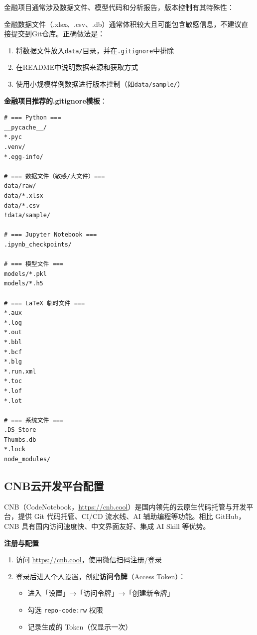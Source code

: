 金融项目通常涉及数据文件、模型代码和分析报告，版本控制有其特殊性：

\begin{warningbox}[数据文件不要纳入Git管理]
金融数据文件（.xlsx、.csv、.db）通常体积较大且可能包含敏感信息，不建议直接提交到Git仓库。正确做法是：
\begin{enumerate}[leftmargin=2em]
  \item 将数据文件放入\texttt{data/}目录，并在\texttt{.gitignore}中排除
  \item 在README中说明数据来源和获取方式
  \item 使用小规模样例数据进行版本控制（如\texttt{data/sample/}）
\end{enumerate}
\end{warningbox}

\textbf{金融项目推荐的.gitignore模板}：

\begin{lstlisting}
# === Python ===
__pycache__/
*.pyc
.venv/
*.egg-info/

# === 数据文件（敏感/大文件）===
data/raw/
data/*.xlsx
data/*.csv
!data/sample/

# === Jupyter Notebook ===
.ipynb_checkpoints/

# === 模型文件 ===
models/*.pkl
models/*.h5

# === LaTeX 临时文件 ===
*.aux
*.log
*.out
*.bbl
*.bcf
*.blg
*.run.xml
*.toc
*.lof
*.lot

# === 系统文件 ===
.DS_Store
Thumbs.db
*.lock
node_modules/
\end{lstlisting}

\subsection{CNB云开发平台配置}

CNB（CodeNotebook，\url{https://cnb.cool}）是国内领先的云原生代码托管与开发平台，提供 Git 代码托管、CI/CD 流水线、AI 辅助编程等功能。相比 GitHub，CNB 具有国内访问速度快、中文界面友好、集成 AI Skill 等优势。

\textbf{注册与配置}

\begin{enumerate}[leftmargin=2em]
  \item 访问 \url{https://cnb.cool}，使用微信扫码注册/登录
  \item 登录后进入个人设置，创建\textbf{访问令牌}（Access Token）：
    \begin{itemize}
      \item 进入「设置」→「访问令牌」→「创建新令牌」
      \item 勾选 \texttt{repo-code:rw} 权限
      \item 记录生成的 Token（仅显示一次）
    \end{itemize}
\end{enumerate}


